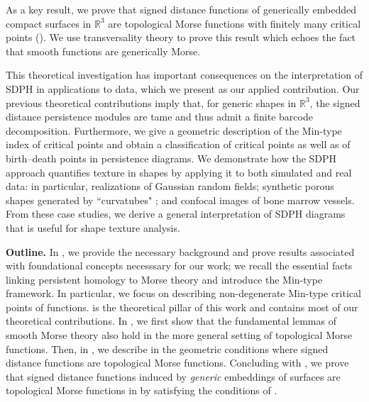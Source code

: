 \documentclass[11pt]{article}
\newcommand{\R}{\mathbb{R}}
\theoremstyle{plain}
\theoremstyle{definition}
\theoremstyle{remark}
\begin{document}
	As a key result, we prove that signed distance functions of generically embedded compact surfaces in $\R^3$ are topological Morse functions with finitely many critical points (). We use transversality theory \citep{abraham_transversal_1967} to prove this result which echoes the fact that smooth functions are generically Morse.
	
	
	This theoretical investigation has important consequences on the interpretation of SDPH in applications to data, which we present as our applied contribution. Our previous theoretical contributions imply that, for generic shapes in $\R^3$, the signed distance persistence modules are tame and thus admit a finite barcode decomposition. Furthermore, we give a geometric description of the Min-type index of critical points and obtain a classification of critical points as well as of birth--death points in persistence diagrams.
	We demonstrate how the SDPH approach quantifies texture in shapes by applying it to both simulated and real data: in particular, realizations of Gaussian random fields; synthetic porous shapes generated by ``curvatubes" \citep{song_generation_2022}; and confocal images of bone marrow vessels. From these case studies, we derive a general interpretation of SDPH diagrams that is useful for shape texture analysis.
	
	
	\textbf{Outline.}
	In , we provide the necessary background and prove results associated with foundational concepts necesssary for our work; we recall the essential facts linking persistent homology to Morse theory and introduce the Min-type framework. In particular, we focus on describing non-degenerate Min-type critical points of functions.  is the theoretical pillar of this work and contains most of our theoretical contributions. In , we first show that the fundamental lemmas of smooth Morse theory also hold in the more general setting of topological Morse functions.
	Then, in , we describe in  the geometric conditions where signed distance functions are topological Morse functions. Concluding with , we prove that signed distance functions induced by \emph{generic} embeddings of surfaces are topological Morse functions in  by satisfying the conditions of .
	
\end{document}
